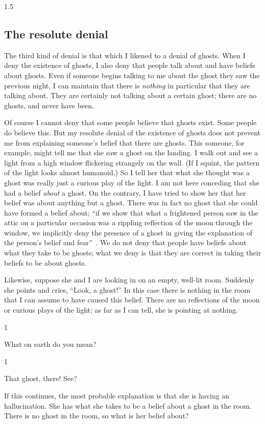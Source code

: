 \documentclass[11pt]{article}
\newcommand{\stage}[3]%
{%
	\begin{spacing}{1}%
	\vspace{0pt}
		\begin{description}[style=nextline, parsep=0pt, leftmargin=15mm, itemindent=-10mm, font=\mdseries]
			\item[\textsc{#1} \emph{#2}] #3
		\end{description}%
	\end{spacing}%
}
\begin{document}
\begin{spacing}{1.5}
\subsection{The resolute denial}
\label{resolute}
The third kind of denial is that which I likened to a denial of ghosts. When I deny the existence of ghosts, I also deny that people talk about and have beliefs about ghosts. Even if someone begins talking to me about the ghost they saw the previous night, I can maintain that there is {\em nothing} in particular that they are talking about. They are certainly not talking about a certain ghost; there are no ghosts, and never have been.

Of course I cannot deny that some people believe that ghosts exist. Some people do believe this. But my resolute denial of the existence of ghosts does not prevent me from explaining someone's belief that there are ghosts. This someone, for example, might tell me that she saw a ghost on the landing. I walk out and see a light from a high window flickering strangely on the wall. (If I squint, the pattern of the light looks almost humanoid.) So I tell her that what she thought was a ghost was really just a curious play of the light. I am not here conceding that she had a belief {\em about} a ghost. On the contrary, I have tried to show her that her belief was about anything but a ghost. There was in fact no ghost that she could have formed a belief about; ``if we show that what a frightened person saw in the attic on a particular occasion was a rippling reflection of the moon through the window, we implicitly deny the presence of a ghost in giving the explanation of the person's belief and fear''~\citep[76]{stroud2000a}. We do not deny that people have beliefs about what they take to be ghosts; what we deny is that they are correct in taking their beliefs to be about ghosts.

Likewise, suppose she and I are looking in on an empty, well-lit room. Suddenly she points and cries, ``Look, a ghost!'' In this case there is nothing in the room that I can assume to have caused this belief. There are no reflections of the moon or curious plays of the light; as far as I can tell, she is pointing at nothing.

\stage{Me}{}{What on earth do you mean?}

\stage{Her}{(pointing)}{That ghost, there! See?}

If this continues, the most probable explanation is that she is having an hallucination. She has what she takes to be a belief about a ghost in the room. There is no ghost in the room, so what is her belief about? 


\end{spacing}
\end{document}
